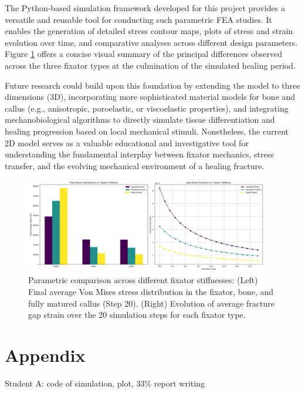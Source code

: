 \documentclass{article}
\begin{document}
The Python-based simulation framework developed for this project provides a versatile and reusable tool for conducting such parametric FEA studies. It enables the generation of detailed stress contour maps, plots of stress and strain evolution over time, and comparative analyses across different design parameters. Figure \ref{fig:parametric_comparison} offers a concise visual summary of the principal differences observed across the three fixator types at the culmination of the simulated healing period.

Future research could build upon this foundation by extending the model to three dimensions (3D), incorporating more sophisticated material models for bone and callus (e.g., anisotropic, poroelastic, or viscoelastic properties), and integrating mechanobiological algorithms to directly simulate tissue differentiation and healing progression based on local mechanical stimuli. Nonetheless, the current 2D model serves as a valuable educational and investigative tool for understanding the fundamental interplay between fixator mechanics, stress transfer, and the evolving mechanical environment of a healing fracture.

\begin{figure}[htbp]
  \centering
  \includegraphics[width=0.95\textwidth]{../output_advanced/parametric_comparison.png}
  \caption{Parametric comparison across different fixator stiffnesses: (Left) Final average Von Mises stress distribution in the fixator, bone, and fully matured callus (Step 20). (Right) Evolution of average fracture gap strain over the 20 simulation steps for each fixator type.}
  \label{fig:parametric_comparison}
\end{figure}

\section{Appendix}

Student A: code of simulation, plot, 33$\%$ report writing
\end{document}
